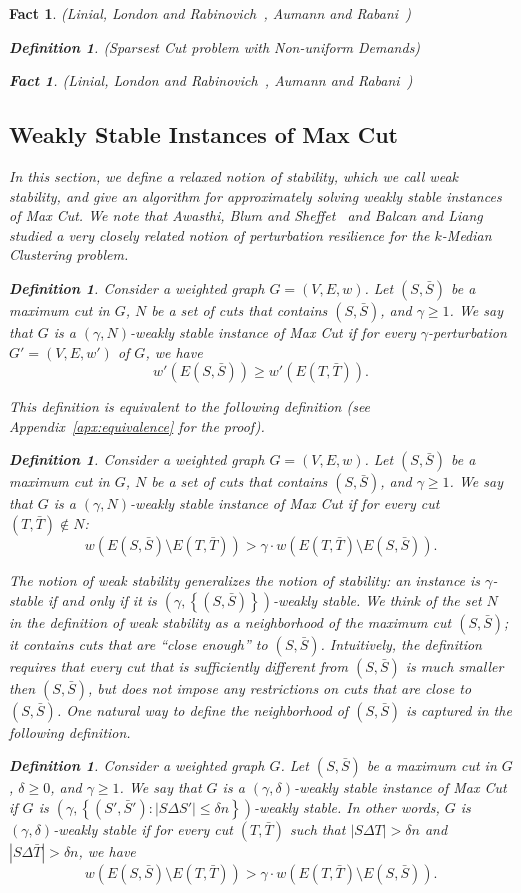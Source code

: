 \documentclass[twoside,leqno,twocolumn]{article}
\newcommand {\set}   [1] {\left\{ #1 \right\}}
\newtheorem{Definition}[theorem]{Definition}
\newtheorem{fact}[theorem]{Fact}
\begin{document}
\begin{fact}{\sc (Linial, London and Rabinovich~\cite{LLR}, Aumann and Rabani~\cite{AR})}
\begin{Definition} {\sc (Sparsest Cut problem with Non-uniform Demands)}
\begin{fact}{\sc (Linial, London and Rabinovich~\cite{LLR}, Aumann and Rabani~\cite{AR})}
\subsection{Weakly Stable Instances of Max Cut}
In this section, we define a relaxed notion of stability, which we call weak stability, and give an algorithm for approximately solving weakly stable
instances of Max Cut.
We note that 
Awasthi, Blum and Sheffet~\cite{Awasthietal} and Balcan and Liang~\cite{BalcanL} studied a very closely related notion of \textit{perturbation resilience} for the $k$-Median Clustering problem.
\begin{Definition}\label{def:weak-stabilityA}
Consider a weighted graph $G=(V,E,w)$. Let $(S,\bar S)$ be a maximum cut in $G$, $N$ be a set of cuts that contains $(S,\bar S)$, and $\gamma \geq 1$.
We say that $G$ is a  $(\gamma, N)$-weakly stable instance of Max Cut 
if for every $\gamma$-perturbation $G'=(V,E,w')$ of $G$, we have
$$w'(E(S,\bar S)) \geq w'(E(T,\bar T)).$$
\end{Definition}
This definition is equivalent to the following definition (see Appendix~\ref{apx:equivalence} for the proof).
\begin{Definition}\label{def:weak-stability}
Consider a weighted graph $G=(V,E,w)$. Let $(S,\bar S)$ be a maximum cut in $G$, $N$ be a set of cuts that contains $(S,\bar S)$, and $\gamma \geq 1$.
We say that $G$ is a  $(\gamma, N)$-weakly stable instance of Max Cut if for every cut $(T, \bar T)\notin N$:
$$w(E(S, \bar S)\setminus E(T, \bar T)) > \gamma\cdot w(E(T, \bar T )\setminus E(S, \bar S)).$$
\end{Definition}
The notion of weak stability generalizes the notion of stability: an instance is $\gamma$-stable if and only if it is $(\gamma, \set{(S,\bar S)})$-weakly
stable. We think of the set $N$ in the definition of weak stability as a neighborhood of the maximum cut $(S, \bar S)$; it contains cuts that are ``close enough'' to $(S, \bar S)$. Intuitively, the definition requires that every cut that is sufficiently different from $(S,\bar S)$ is much smaller then $(S,\bar S)$, but does not impose any restrictions on cuts that are close to $(S,\bar S)$. One natural way to define the neighborhood of $(S,\bar S)$
is captured in the following definition.
\begin{Definition}\label{def:weak-stability-delta}
Consider a weighted graph $G$. Let $(S,\bar S)$ be a maximum cut in $G$, $\delta \geq 0$, and $\gamma \geq 1$.
We say that $G$ is a  $(\gamma, \delta)$-weakly stable instance of Max Cut if $G$ is $(\gamma, \set{(S',\bar S'): |S\Delta S'| \leq \delta n})$-weakly
stable.
In other words,  $G$ is  $(\gamma, \delta)$-weakly stable if 
for every cut $(T, \bar T)$ such that $|S \Delta T| > \delta n$ and $|S \Delta {\bar T}| > \delta n$, we have
$$w(E(S, \bar S)\setminus E(T, \bar T)) > \gamma\cdot w(E(T, \bar T )\setminus E(S, \bar S)).$$
\end{Definition}


\end{fact}
\end{Definition}
\end{fact}
\end{document}
